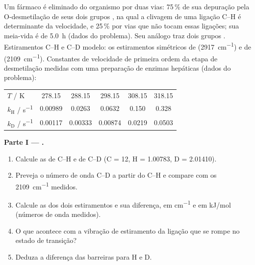 \begin{problem}
\label{pb:b3:rate-theories:1}
Um fármaco é eliminado do organismo por duas vias: 75\,\% de sua depuração pela
O-desmetilação de seus dois grupos , na qual a clivagem de uma ligação C--H é
determinante da velocidade, e 25\,\% por vias que não tocam essas ligações; sua
meia-vida é de \qty{5.0}{h} (dados do problema). Seu análogo traz dois grupos
. Estiramentos C--H e C--D modelo: os estiramentos simétricos de 
(\qty{2917}{cm^{-1}}) e de  (\qty{2109}{cm^{-1}}). Constantes de velocidade de primeira
ordem da etapa de desmetilação medidas com uma preparação de enzimas hepáticas (dados
do problema):
\begin{center}\small
\begin{tabular}{lccccc}
\hline
$T$ / K & 278.15 & 288.15 & 298.15 & 308.15 & 318.15 \\
$k_{\mathrm H}$ / \unit{s^{-1}} & 0.00989 & 0.0263 & 0.0632 & 0.150 & 0.328 \\
$k_{\mathrm D}$ / \unit{s^{-1}} & 0.00117 & 0.00333 & 0.00874 & 0.0219 & 0.0503 \\ \hline
\end{tabular}
\end{center}

\medskip\noindent\textbf{Parte I --- .}
\begin{enumerate}
  \item Calcule as  de C--H e de C--D (C = 12, H = 1.00783,
        D = 2.01410).
  \item Preveja o número de onda C--D a partir do C--H e compare com os
        \qty{2109}{cm^{-1}} medidos.
  \item Calcule as  dos dois estiramentos e sua diferença,
        em \unit{cm^{-1}} e em \unit{kJ/mol} (números de onda medidos).
  \item O que acontece com a vibração de estiramento da ligação que se rompe no
        estado de transição?
  \item Deduza a diferença das barreiras para H e D.
\end{enumerate}


\end{problem}
